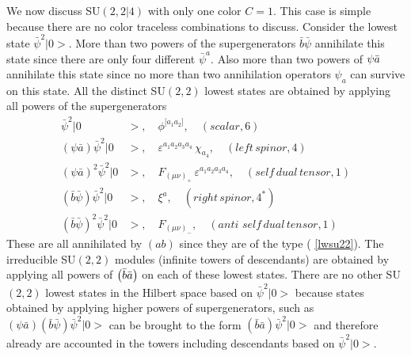 \documentclass[a4paper,aps,preprint,nofootinbib]{revtex4}
\begin{document}
We now discuss SU$\left( 2,2|4\right) $ with only one color $C=1.$ This case
is simple because there are no color traceless combinations to discuss.
Consider the lowest state $\bar{\psi}^{2}|0>.$ More than two powers of the
supergenerators $\bar{b}\bar{\psi}$ annihilate this state since there are
only four different $\bar{\psi}^{a}.$ Also more than two powers of $\psi\bar{%
a}$ annihilate this state since no more than two annihilation operators $%
\psi_{a}$ can survive on this state. All the distinct SU$\left( 2,2\right) $
lowest states are obtained by applying all powers of the supergenerators
\begin{align}
\bar{\psi}^{2}|0 & >,\quad\phi^{\lbrack a_{1}a_{2}]},\quad\left(
scalar,6\right)  \label{c1scalar} \\
\left( \psi\bar{a}\right) \bar{\psi}^{2}|0 &
>,\quad\varepsilon^{a_{1}a_{2}a_{3}a_{4}}\,\chi_{a_{4}},\quad\left(
left\,spinor,4\right) \\
\left( \psi\bar{a}\right) ^{2}\bar{\psi}^{2}|0 & >,\quad F_{\left( \mu
\nu\right) _{+}}\,\varepsilon^{a_{1}a_{2}a_{3}a_{4}},\quad\left(
self\,dual\,tensor,1\right) \\
\left( \bar{b}\bar{\psi}\right) \bar{\psi}^{2}|0 &
>,\quad\xi^{a},\quad\left( right\,spinor,4^{\ast}\right) \\
\left( \bar{b}\bar{\psi}\right) ^{2}\bar{\psi}^{2}|0 & >,\quad F_{\left(
\mu\nu\right) _{-}},\quad\left( anti\,\,self\,dual\,tensor,1\right)
\end{align}
These are all annihilated by $\left( ab\right) $ since they are of the type (%
\ref{lwsu22}). The irreducible SU$\left( 2,2\right) $ modules (infinite
towers of descendants) are obtained by applying all powers of $\left( \bar
{%
b}\bar{a}\right) $ on each of these lowest states. There are no other SU$%
\left( 2,2\right) $ lowest states in the Hilbert space based on $\bar{\psi}%
^{2}|0>$ because states obtained by applying higher powers of
supergenerators, such as $\left( \psi\bar{a}\right) \left( \bar{b}\bar {\psi}%
\right) \bar{\psi}^{2}|0>$ can be brought to the form $\left( \bar
{b}\bar{a%
}\right) \bar{\psi}^{2}|0>$ and therefore already are accounted in the
towers including descendants based on $\bar{\psi}^{2}|0>.$
\end{document}
